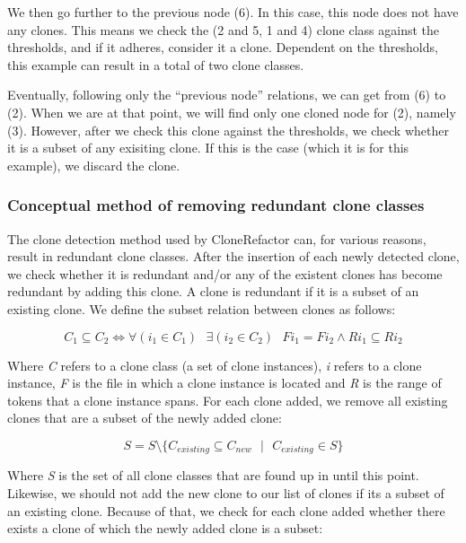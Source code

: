 We then go further to the previous node (6). In this case, this node does not have any clones. This means we check the (2 and 5, 1 and 4) clone class against the thresholds, and if it adheres, consider it a clone. Dependent on the thresholds, this example can result in a total of two clone classes.

Eventually, following only the ``previous node'' relations, we can get from (6) to (2). When we are at that point, we will find only one cloned node for (2), namely (3). However, after we check this clone against the thresholds, we check whether it is a subset of any exisiting clone. If this is the case (which it is for this example), we discard the clone.

\subsubsection{Conceptual method of removing redundant clone classes}\label{sec:conceptualremovingredundant}
The clone detection method used by CloneRefactor can, for various reasons,%
result in redundant clone classes. After the insertion of each newly detected clone, we check whether it is redundant and/or any of the existent clones has become redundant by adding this clone. A clone is redundant if it is a subset of an existing clone. We define the subset relation between clones as follows:

\begin{equation}\label{eq:subset}
C_1 \subseteq C_2 \Leftrightarrow \forall (i_1 \in C_1) \text{ } \exists (i_2 \in C_2) \text{ } F i_1 = F i_2 \wedge R i_1 \subseteq R i_2
\end{equation}

Where \textit{C} refers to a clone class (a set of clone instances), \textit{i} refers to a clone instance, \textit{F} is the file in which a clone instance is located and \textit{R} is the range of tokens that a clone instance spans. For each clone added, we remove all existing clones that are a subset of the newly added clone:

\begin{equation}\label{eq:removeall}
S = S \setminus \{C_{existing} \subseteq C_{new}\text{ }|\text{ }C_{existing} \in S\}
\end{equation}

Where \textit{S} is the set of all clone classes that are found up in until this point. Likewise, we should not add the new clone to our list of clones if its a subset of an existing clone. Because of that, we check for each clone added whether there exists a clone of which the newly added clone is a subset:

